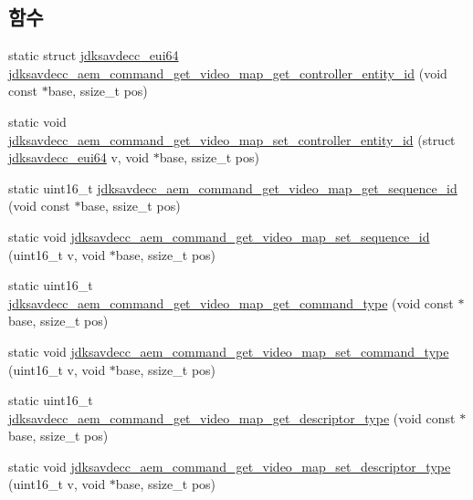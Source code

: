 \subsection*{함수}
\begin{DoxyCompactItemize}
\item 
static struct \hyperlink{structjdksavdecc__eui64}{jdksavdecc\+\_\+eui64} \hyperlink{group__command__get__video__map_gab553a9add65f2fde36e1f09962840d7f}{jdksavdecc\+\_\+aem\+\_\+command\+\_\+get\+\_\+video\+\_\+map\+\_\+get\+\_\+controller\+\_\+entity\+\_\+id} (void const $\ast$base, ssize\+\_\+t pos)
\item 
static void \hyperlink{group__command__get__video__map_ga1d09b8d2353b38138f9c5221c0bb57f2}{jdksavdecc\+\_\+aem\+\_\+command\+\_\+get\+\_\+video\+\_\+map\+\_\+set\+\_\+controller\+\_\+entity\+\_\+id} (struct \hyperlink{structjdksavdecc__eui64}{jdksavdecc\+\_\+eui64} v, void $\ast$base, ssize\+\_\+t pos)
\item 
static uint16\+\_\+t \hyperlink{group__command__get__video__map_gab539f193cde3719af46c604a004a9771}{jdksavdecc\+\_\+aem\+\_\+command\+\_\+get\+\_\+video\+\_\+map\+\_\+get\+\_\+sequence\+\_\+id} (void const $\ast$base, ssize\+\_\+t pos)
\item 
static void \hyperlink{group__command__get__video__map_gaae3e0938fc675add74bd963c4dc1ffc2}{jdksavdecc\+\_\+aem\+\_\+command\+\_\+get\+\_\+video\+\_\+map\+\_\+set\+\_\+sequence\+\_\+id} (uint16\+\_\+t v, void $\ast$base, ssize\+\_\+t pos)
\item 
static uint16\+\_\+t \hyperlink{group__command__get__video__map_ga6129043dabf93b1294da5ddc48841e87}{jdksavdecc\+\_\+aem\+\_\+command\+\_\+get\+\_\+video\+\_\+map\+\_\+get\+\_\+command\+\_\+type} (void const $\ast$base, ssize\+\_\+t pos)
\item 
static void \hyperlink{group__command__get__video__map_ga2bdef3a713bda496f3fe0998e79cacac}{jdksavdecc\+\_\+aem\+\_\+command\+\_\+get\+\_\+video\+\_\+map\+\_\+set\+\_\+command\+\_\+type} (uint16\+\_\+t v, void $\ast$base, ssize\+\_\+t pos)
\item 
static uint16\+\_\+t \hyperlink{group__command__get__video__map_ga355d11fb483fc9e21faa5663a079cfaa}{jdksavdecc\+\_\+aem\+\_\+command\+\_\+get\+\_\+video\+\_\+map\+\_\+get\+\_\+descriptor\+\_\+type} (void const $\ast$base, ssize\+\_\+t pos)
\item 
static void \hyperlink{group__command__get__video__map_ga6048afab9d86174f17ef15159949937a}{jdksavdecc\+\_\+aem\+\_\+command\+\_\+get\+\_\+video\+\_\+map\+\_\+set\+\_\+descriptor\+\_\+type} (uint16\+\_\+t v, void $\ast$base, ssize\+\_\+t pos)

\end{DoxyCompactItemize}
